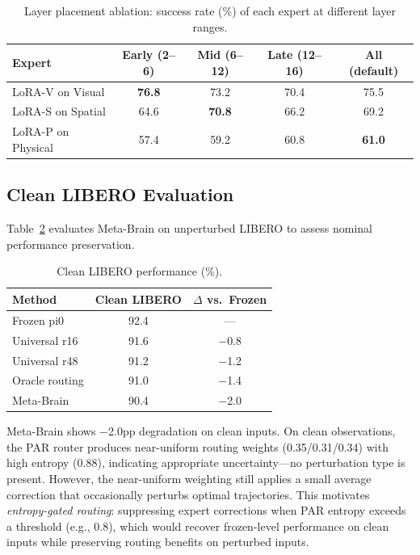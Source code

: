 \documentclass[10pt,twocolumn]{article}
\begin{document}
\begin{table}[h]
\centering
\caption{Layer placement ablation: success rate (\%) of each expert at different layer ranges.}
\label{tab:layer_placement}
\small
\begin{tabular}{lcccc}
\toprule
Expert & Early (2--6) & Mid (6--12) & Late (12--16) & All (default) \\
\midrule
LoRA-V on Visual & \textbf{76.8} & 73.2 & 70.4 & 75.5 \\
LoRA-S on Spatial & 64.6 & \textbf{70.8} & 66.2 & 69.2 \\
LoRA-P on Physical & 57.4 & 59.2 & 60.8 & \textbf{61.0} \\
\bottomrule
\end{tabular}
\end{table}

\subsection{Clean LIBERO Evaluation}
\label{sec:clean}

Table~\ref{tab:clean} evaluates Meta-Brain on unperturbed LIBERO to assess nominal performance preservation.

\begin{table}[h]
\centering
\caption{Clean LIBERO performance (\%).}
\label{tab:clean}
\small
\begin{tabular}{lcc}
\toprule
Method & Clean LIBERO & $\Delta$ vs.\ Frozen \\
\midrule
Frozen pi0 & 92.4 & --- \\
Universal r16 & 91.6 & $-$0.8 \\
Universal r48 & 91.2 & $-$1.2 \\
Oracle routing & 91.0 & $-$1.4 \\
Meta-Brain & 90.4 & $-$2.0 \\
\bottomrule
\end{tabular}
\end{table}

Meta-Brain shows $-$2.0pp degradation on clean inputs.
On clean observations, the PAR router produces near-uniform routing weights (0.35/0.31/0.34) with high entropy (0.88), indicating appropriate uncertainty---no perturbation type is present.
However, the near-uniform weighting still applies a small average correction that occasionally perturbs optimal trajectories.
This motivates \emph{entropy-gated routing}: suppressing expert corrections when PAR entropy exceeds a threshold (e.g., 0.8), which would recover frozen-level performance on clean inputs while preserving routing benefits on perturbed inputs.
\end{document}
